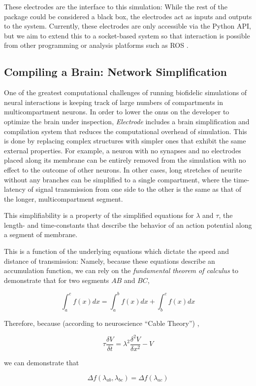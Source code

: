 \documentclass[letter, twocolumn]{article}
\begin{document}
These electrodes are the interface to this simulation: While the rest of the package could be considered a black box, the electrodes act as inputs and outputs to the system. Currently, these electrodes are only accessible via the Python API, but we aim to extend this to a socket-based system so that interaction is possible from other programming or analysis platforms such as ROS \cite{ROS}.

\subsection{Compiling a Brain: Network Simplification}
One of the greatest computational challenges of running biofidelic simulations of neural interactions is keeping track of large numbers of compartments in multicompartment neurons. In order to lower the onus on the developer to optimize the brain under inspection, \textit{Electrode} includes a brain simplification and compilation system that reduces the computational overhead of simulation. This is done by replacing complex structures with simpler ones that exhibit the same external properties. For example, a neuron with no synapses and no electrodes placed along its membrane can be entirely removed from the simulation with no effect to the outcome of other neurons. In other cases, long stretches of neurite without any branches can be simplified to a single compartment, where the time-latency of signal transmission from one side to the other is the same as that of the longer, multicompartment segment.

This simplifiability is a property of the simplified equations for $\lambda$ and $\tau$, the length- and time-constants that describe the behavior of an action potential along a segment of membrane.

This is a function of the underlying equations which dictate the speed and distance of transmission: Namely, because these equations describe an accumulation function, we can rely on the \textit{fundamental theorem of calculus} to demonstrate that for two segments $AB$ and $BC$,

$$\int_a^c f(x)dx = \int_a^b f(x)dx + \int_b^c f(x)dx $$

Therefore, because (according to neuroscience ``Cable Theory'') \cite{cableTheory},

$$\tau \frac{\delta V}{\delta t} = \lambda^2 \frac{\delta^2 V}{\delta x^2} - V$$

we can demonstrate that

$$ \Delta f(\lambda_{ab}, \lambda_{bc}) = \Delta f(\lambda_{ac})$$
\end{document}
